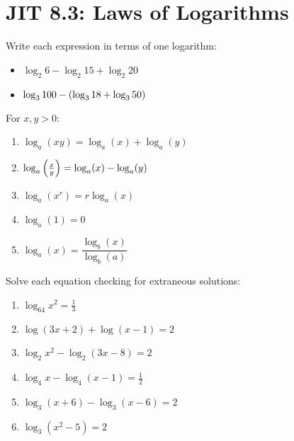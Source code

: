 \documentclass[../mathNotesPreamble]{subfiles}
\begin{document}
\section{JIT 8.3: Laws of Logarithms}
  \begin{ex*}
    Write each expression in terms of one logarithm:\\
    
    \noindent
    \begin{minipage}{0.6\linewidth}
      \begin{itemize}
        \item[] $\log_2 6-\log_2 15+\log_2 20$\\[50pt]
        \item[] $\log_3 100-{\left(\log_3 18+\log_3 50\right)}$\\[50pt]
      \end{itemize}
    \end{minipage}%
    \begin{minipage}{0.4\linewidth}
      \begin{flushright}
        \begin{thmBox*}
          For $x,y>0$:
            \begin{enumerate}
              \item $\log_a(xy)=\log_a(x)+\log_a(y)$
              \item $\log_a{\left(\frac{x}{y}\right)}=\log_a(x)-\log_a(y)$
              \item $\log_a(x^r)=r\log_a(x)$
              \item $\log_a(1)=0$
              \item $\log_a(x)=\dfrac{\log_b(x)}{\log_b(a)}$
            \end{enumerate}
        \end{thmBox*}
      \end{flushright}
    \end{minipage}
  \end{ex*}
  \pagebreak
  \begin{ex*}
    Solve each equation checking for extraneous solutions:
    \begin{enumerate}[label=, itemsep=\stretch{1}]
      \item $\log_{64}x^2=\frac{1}{3}$
      \item $\log(3x+2)+\log(x-1)=2$
      \item $\log_2 x^2-\log_2(3x-8)=2$
      \item $\log_4 x-\log_4(x-1)=\frac{1}{2}$
      \item $\log_3(x+6)-\log_3(x-6)=2$
      \item $\log_3(x^2-5)=2$
    \end{enumerate}
  \end{ex*}
  \pagebreak
\end{document}
